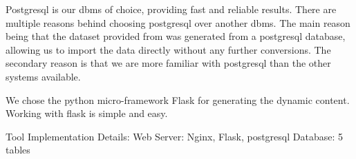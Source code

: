 \documentclass[conference, draftclsnofoot]{IEEEtran}
\begin{document}
Postgresql is our dbms of choice, providing fast and reliable results. There
are multiple reasons behind choosing postgresql over another dbms. The main
reason being that the dataset provided from  was generated from
a postgresql database, allowing us to import the data directly without any
further conversions. The secondary reason is that we are more familiar with
postgresql than the other systems available.

We chose the python micro-framework Flask for generating the dynamic content.
Working with flask is simple and easy.

Tool Implementation Details:
	Web Server: Nginx, Flask, postgresql
	Database: 5 tables


% 
% 
% 
% 
% 
% 
\end{document}

